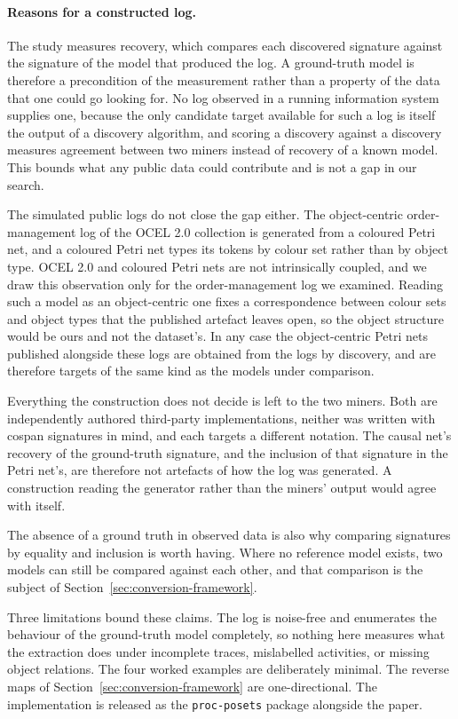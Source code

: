 \paragraph{Reasons for a constructed log.}
The study measures recovery, which compares each discovered signature against the signature of
the model that produced the log. A ground-truth model is therefore a precondition of the
measurement rather than a property of the data that one could go looking for. No log observed in
a running information system supplies one, because the only candidate target available for such a
log is itself the output of a discovery algorithm, and scoring a discovery against a discovery
measures agreement between two miners instead of recovery of a known model. This bounds what any
public data could contribute and is not a gap in our search.

The simulated public logs do not close the gap either. The object-centric order-management log
of the OCEL 2.0 collection is generated from a coloured Petri net, and a coloured Petri net types
its tokens by colour set rather than by object type. OCEL 2.0 and coloured Petri nets are not
intrinsically coupled, and we draw this observation only for the order-management log we examined.
Reading such a model as an object-centric one fixes a
correspondence between colour sets and object types that the published artefact leaves open, so
the object structure would be ours and not the dataset's. In any case the object-centric Petri nets published
alongside these logs are obtained from the logs by discovery, and are therefore targets of the
same kind as the models under comparison.

Everything the construction does not decide is left to the two miners. Both are independently authored
third-party implementations, neither was written with cospan signatures in mind, and each targets
a different notation. The causal net's recovery of the ground-truth signature, and the inclusion of
that signature in the Petri net's, are therefore not artefacts of how the log was generated. A construction reading the generator
rather than the miners' output would agree with itself.

The absence of a ground truth in observed data is also why comparing signatures by equality and
inclusion is worth having. Where no reference model exists, two models can still be compared against each
other, and that comparison is the subject of Section~\ref{sec:conversion-framework}.

Three limitations bound these claims. The log is noise-free and enumerates the behaviour of the
ground-truth model completely, so nothing here measures what the extraction does under incomplete
traces, mislabelled activities, or missing object relations. The four worked examples are
deliberately minimal. The reverse maps of Section~\ref{sec:conversion-framework} are
one-directional. The implementation is released as the \texttt{proc-posets} package alongside the
paper.
